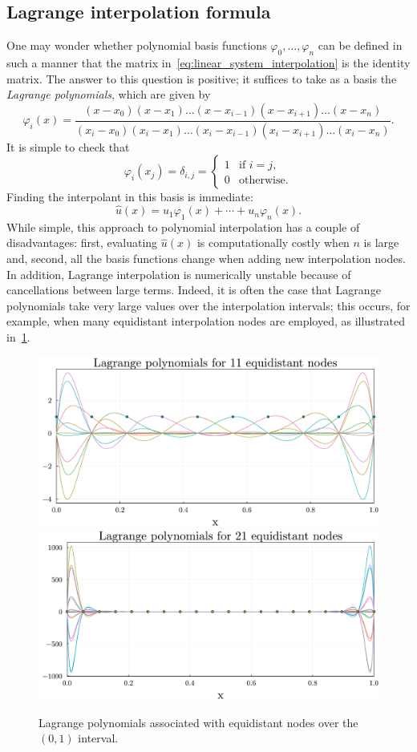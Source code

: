 \subsection{Lagrange interpolation formula}
One may wonder whether polynomial basis functions $\varphi_0, \dotsc, \varphi_n$ can be defined in such a manner that
the matrix in~\eqref{eq:linear_system_interpolation} is the identity matrix.
The answer to this question is positive;
it suffices to take as a basis the \emph{Lagrange polynomials},
which are given by
\[
    \varphi_{i}(x)
    = \frac{(x - x_0) (x - x_1) \dotsc (x - x_{i-1}) (x - x_{i+1}) \dotsc (x - x_n)}
    {(x_i - x_0) (x_i - x_1) \dotsc (x_i - x_{i-1}) (x_i - x_{i+1}) \dotsc (x_i - x_n)}.
\]
It is simple to check that
\[
    \varphi_i(x_j) =
    \delta_{i,j} =
    \begin{cases}
        1 & \text{if $i = j$}, \\
        0 & \text{otherwise.}
    \end{cases}
\]
Finding the interpolant in this basis is immediate:
\[
    \widehat u(x) = u_1 \varphi_1(x) + \dotsb + u_n \varphi_n(x).
\]
While simple, this approach to polynomial interpolation has a couple of disadvantages:
first, evaluating $\widehat u(x)$ is computationally costly when $n$ is large and,
second, all the basis functions change when adding new interpolation nodes.
In addition, Lagrange interpolation is numerically unstable because of cancellations between large terms.
Indeed, it is often the case that Lagrange polynomials take very large values over the interpolation intervals;
this occurs, for example,
when many equidistant interpolation nodes are employed,
as illustrated in~\cref{fig:lagrange}.
\begin{figure}[ht]
    \centering
    \includegraphics[width=0.8\linewidth]{figures/lagrange_10.pdf}
    \includegraphics[width=0.8\linewidth]{figures/lagrange_20.pdf}
    \caption{Lagrange polynomials associated with equidistant nodes over the $(0, 1)$ interval.}%
    \label{fig:lagrange}
\end{figure}

